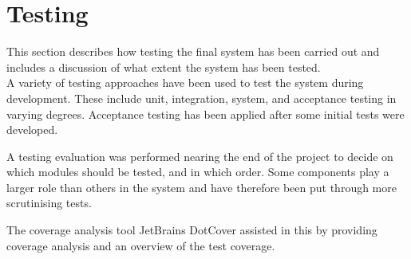 \section{Testing}
This section describes how testing the final system has been carried out and includes a discussion of what extent the system has been tested. \\

A variety of testing approaches have been used to test the system during development. These include unit, integration, system, and acceptance testing in varying degrees. Acceptance testing has been applied after some initial tests were developed.

A testing evaluation was performed nearing the end of the project to decide on which modules should be tested, and in which order. Some components play a larger role than others in the system and have therefore been put through more scrutinising tests. 

The coverage analysis tool JetBrains DotCover assisted in this by providing coverage analysis and an overview of the test coverage. 





